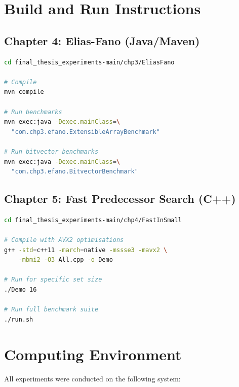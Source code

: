 \section{Build and Run Instructions}
\label{sec:build}

\subsection{Chapter 4: Elias-Fano (Java/Maven)}

\begin{lstlisting}[language=bash, caption={Building and running Chapter 4 experiments}]
cd final_thesis_experiments-main/chp3/EliasFano

# Compile
mvn compile

# Run benchmarks
mvn exec:java -Dexec.mainClass=\
  "com.chp3.efano.ExtensibleArrayBenchmark"

# Run bitvector benchmarks
mvn exec:java -Dexec.mainClass=\
  "com.chp3.efano.BitvectorBenchmark"
\end{lstlisting}

\subsection{Chapter 5: Fast Predecessor Search (C++)}

\begin{lstlisting}[language=bash, caption={Building and running Chapter 5 experiments}]
cd final_thesis_experiments-main/chp4/FastInSmall

# Compile with AVX2 optimisations
g++ -std=c++11 -march=native -mssse3 -mavx2 \
    -mbmi2 -O3 All.cpp -o Demo

# Run for specific set size
./Demo 16

# Run full benchmark suite
./run.sh
\end{lstlisting}

\section{Computing Environment}
\label{sec:environment}

All experiments were conducted on the following system:

